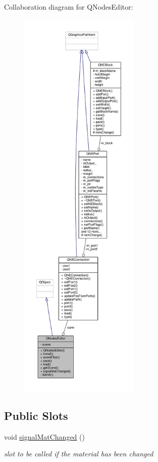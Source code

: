 Collaboration diagram for Q\-Nodes\-Editor\-:
\nopagebreak
\begin{figure}[H]
\begin{center}
\leavevmode
\includegraphics[height=550pt]{class_q_nodes_editor__coll__graph}
\end{center}
\end{figure}
\subsection*{Public Slots}
\begin{DoxyCompactItemize}
\item 
\hypertarget{class_q_nodes_editor_a19ca88667c1c33a8a60ab7afa0caf74c}{void \hyperlink{class_q_nodes_editor_a19ca88667c1c33a8a60ab7afa0caf74c}{signal\-Mat\-Changed} ()}\label{class_q_nodes_editor_a19ca88667c1c33a8a60ab7afa0caf74c}

\begin{DoxyCompactList}\small\item\em slot to be called if the material has been changed \end{DoxyCompactList}\end{DoxyCompactItemize}
